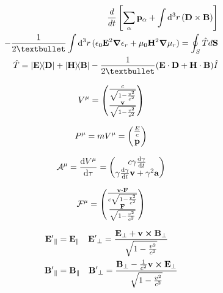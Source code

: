 \documentclass[11pt,twoside]{article}
\begin{document}
\begin{multicols}{3}
\begin{equation}
\begin{split}
\frac{d}{dt}\left[\sum_{\alpha} \vb{p}_{\alpha} + \int \dd[3]{r} (\vb{D} \times \vb{B}) \right] \\ - \frac{1}{2•}\int \dd[3]{r}(\epsilon_0 \vb{E}^2 \gradient \epsilon_r + \mu_0\vb{H}^2 \gradient \mu_r) = \oint_S \hat{T}d\vb{S} \\
\hat{T} = \dyad{\vb{E}}{\vb{D}} + \dyad{\vb{H}}{\vb{B}} - \frac{1}{2•}(\vb{E}\cdot\vb{D}+\vb{H}\cdot\vb{B})\hat{I}
\end{split}
\end{equation}

\begin{equation}
V^{\mu} = \mqty(\frac{c}{\sqrt{1-\frac{v^2}{c^2}}}\\\frac{\vb{v}}{\sqrt{1-\frac{v^2}{c^2}}})
\end{equation}

\begin{equation}
P^{\mu} = mV^{\mu} = \mqty(\frac{E}{c}\\\vb{p})
\end{equation}

\begin{equation}
\mathcal{A}^\mu = \dv{V^{\mu}}{\tau} = \mqty(c\gamma\dv{\gamma}{t}\\\gamma\dv{\gamma}{t}\vb{v}+\gamma^2\vb{a})
\end{equation}

\begin{equation}
\mathcal{F}^\mu = \mqty(\frac{\vb{v}\vdot\vb{F}}{c\sqrt{1-\frac{v^2}{c^2}}}\\\frac{\vb{F}}{\sqrt{1-\frac{v^2}{c^2}}})
\end{equation}

\begin{equation}
\begin{split}
\vb{E'}_{\parallel} &= \vb{E}_{\parallel} \quad \vb{E'}_{\perp} = \frac{\vb{E}_{\perp}+\vb{v}\cross\vb{B}_{\perp}}{\sqrt{1-\frac{v^2}{c^2}}} \\
\vb{B'}_{\parallel} &= \vb{B}_{\parallel}  \quad \vb{B'}_{\perp} = \frac{\vb{B}_{\perp} - \frac{1}{c^2}\vb{v}\cross\vb{E}_{\perp}}{\sqrt{1-\frac{v^2}{c^2}}}
\end{split}
\end{equation}



\end{multicols}
\end{document}
